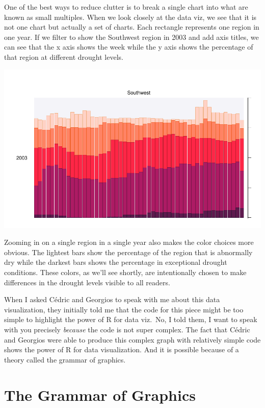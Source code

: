 \documentclass[
]{book}
\begin{document}
One of the best ways to reduce clutter is to break a single chart into what are known as small multiples. When we look closely at the data viz, we see that it is not one chart but actually a set of charts. Each rectangle represents one region in one year. If we filter to show the Southwest region in 2003 and add axis titles, we can see that the x axis shows the week while the y axis shows the percentage of that region at different drought levels.

\includegraphics[width=1\linewidth]{data-viz_files/figure-latex/unnamed-chunk-5-1}

Zooming in on a single region in a single year also makes the color choices more obvious. The lightest bars show the percentage of the region that is abnormally dry while the darkest bars shows the percentage in exceptional drought conditions. These colors, as we'll see shortly, are intentionally chosen to make differences in the drought levels visible to all readers.

When I asked Cédric and Georgios to speak with me about this data visualization, they initially told me that the code for this piece might be too simple to highlight the power of R for data viz.~No, I told them, I want to speak with you precisely \emph{because} the code is not super complex. The fact that Cédric and Georgios were able to produce this complex graph with relatively simple code shows the power of R for data visualization. And it is possible because of a theory called the grammar of graphics.

\hypertarget{the-grammar-of-graphics}{%
\section{The Grammar of Graphics}\label{the-grammar-of-graphics}}
\end{document}

